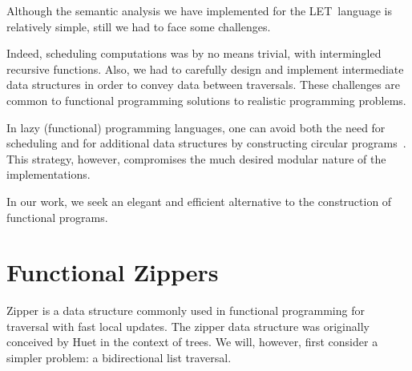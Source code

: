 \documentclass[runningheads]{llncs}
\newcommand{\Let}{{\sf LET}}
\begin{document}
Although the semantic analysis we have implemented for the \Let\ language is
relatively simple, still we had to face some challenges.

Indeed, scheduling computations was by no means trivial, with intermingled
recursive functions. Also, we had to carefully design and implement intermediate
data structures in order to convey data between traversals. These challenges are
common to functional programming solutions to realistic programming problems.

In lazy (functional) programming languages, one can avoid both the need for
scheduling and for additional data structures by constructing circular
programs~\cite{Bird84}. This strategy, however, compromises the much desired
modular nature of the implementations.

In our work, we seek an elegant and efficient alternative to the construction of
functional programs.





\section{Functional Zippers}
  Zipper is a data structure commonly used in functional programming for
  traversal with fast local updates. The zipper data structure was originally
  conceived by Huet\cite{huet1997zipper} in the context of trees. We will,
  however, first consider a simpler problem: a bidirectional list traversal.
\end{document}

